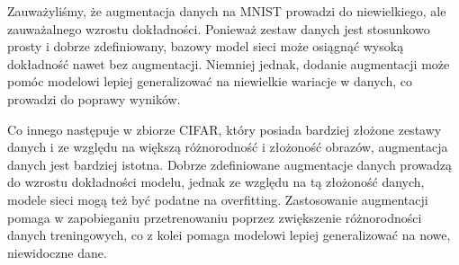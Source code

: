 \documentclass[10pt]{article}
\begin{document}
Zauważyliśmy, że augmentacja danych na MNIST prowadzi do niewielkiego, ale zauważalnego wzrostu dokładności.
Ponieważ zestaw danych jest stosunkowo prosty i dobrze zdefiniowany, bazowy model sieci może osiągnąć wysoką dokładność nawet bez augmentacji.
Niemniej jednak, dodanie augmentacji może pomóc modelowi lepiej generalizować na niewielkie wariacje w danych, co prowadzi do poprawy wyników.

Co innego następuje w zbiorze CIFAR, który posiada bardziej złożone zestawy danych i ze względu na większą różnorodność i złożoność obrazów, augmentacja danych jest bardziej istotna.
Dobrze zdefiniowane augmentacje danych prowadzą do wzrostu dokładności modelu, jednak ze względu na tą złożoność danych, modele sieci mogą też być podatne na overfitting.
Zastosowanie augmentacji pomaga w zapobieganiu przetrenowaniu poprzez zwiększenie różnorodności danych treningowych, co z kolei pomaga modelowi lepiej generalizować na nowe, niewidoczne dane.
\end{document}
